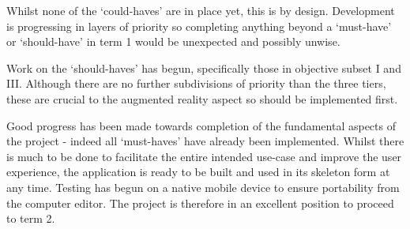 \documentclass{article}
\begin{document}
Whilst none of the `could-haves' are in place yet, this is by design. Development is progressing in layers of priority so completing anything beyond a `must-have' or `should-have' in term 1 would be unexpected and possibly unwise. 

Work on the `should-haves' has begun, specifically those in objective subset I and III. Although there are no further subdivisions of priority than the three tiers, these are crucial to the augmented reality aspect so should be implemented first.

Good progress has been made towards completion of the fundamental aspects of the project - indeed all `must-haves' have already been implemented. Whilst there is much to be done to facilitate the entire intended use-case and improve the user experience, the application is ready to be built and used in its skeleton form at any time. Testing has begun on a native mobile device to ensure portability from the computer editor. The project is therefore in an excellent position to proceed to term 2. 
\end{document}
